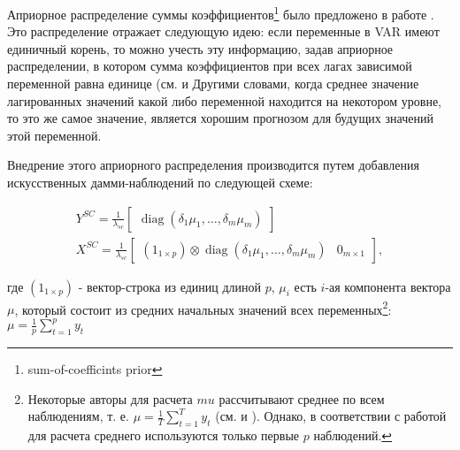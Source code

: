 \documentclass[11pt]{article} %
\DeclareMathOperator{\diag}{diag}
\newcommand{\post}{\overline}
\begin{document}
Априорное распределение суммы коэффициентов\footnote{sum-of-coefficints prior} было предложено в работе  \cite{doan_al_1984}. Это распределение отражает следующую идею: если переменные в VAR имеют единичный корень, то можно учесть эту информацию, задав априорное распределении, в котором сумма коэффициентов при всех лагах зависимой переменной равна единице (см. \cite{robertson_tallman_1999} и \cite{blake_mumtaz_2012} Другими словами, когда среднее значение лагированных значений какой либо переменной находится на некотором уровне, то это же самое значение, является хорошим прогнозом  для будущих значений этой переменной. 



Внедрение этого априорного распределения производится путем добавления искусственных дамми-наблюдений по следующей схеме:


\begin{gather}
Y^{SC}=\frac{1}{\lambda_{sc}}\begin{bmatrix}\diag(\delta_1\mu_1,\ldots,\delta_m\mu_m)\end{bmatrix}\\
X^{SC}=\frac{1}{\lambda_{sc}}\begin{bmatrix}(1_{1\times p})\otimes \diag(\delta_1\mu_1,\ldots,\delta_m\mu_m) &0_{m\times 1}\end{bmatrix},
\end{gather}

где $(1_{1\times p})$ - вектор-строка из единиц длиной $p$, $\mu_i$ есть $i$-ая компонента вектора $\mu$, который состоит из средних начальных значений всех переменных\footnote{Некоторые авторы для  расчета $mu$ рассчитывают среднее по всем наблюдениям, т. е. $\mu=\frac{1}{T}\sum_{t=1}^T y_t$ (см. \cite{banbura_al_2010} и \cite{carriero_al_2015}). Однако, в соответствии с работой \cite{sims_zha_1998} для расчета среднего используются только первые $p$ наблюдений.}: $\mu=\frac{1}{p}\sum_{t=1}^p y_t$  
\end{document}
